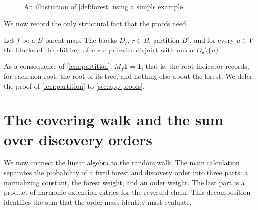 \documentclass[onefignum,onetabnum]{siamart250211}
\numberwithin{theorem}{section}
\numberwithin{equation}{section}
\newcommand{\one}{\mathbf{1}}
\begin{document}
\begin{figure}[H]
{}
\caption{An illustration of \cref{def:forest} using a simple example.}
\label{fig:example}
\end{figure}



We now record the only structural
fact that the proofs need.

\begin{lemma}[Blocks]\label{lem:partition}
Let $f$ be a $B$-parent map. The blocks $D_r$, $r\in B$, partition
$B^c$, and for every $u\in V$ the blocks of the children of $u$ are
pairwise disjoint with union $D_u\setminus\{u\}$.
\end{lemma}

As a consequence of \cref{lem:partition}, $M_f\one=\one$; that is,
the root indicator records, for each non-root, the root of its tree,
and nothing else about the forest. We defer the proof of
\cref{lem:partition} to \cref{sec:app-proofs}.



\section{The covering walk and the sum over discovery orders}\label{sec:walk}

We now connect the linear algebra to the random walk. The main
calculation separates the probability of a fixed forest and discovery
order into three parts: a normalizing constant, the forest weight,
and an order weight. The last part is a product of harmonic extension
entries for the reversed chain. This decomposition identifies the sum
that the order-mass identity must evaluate.
\end{document}
